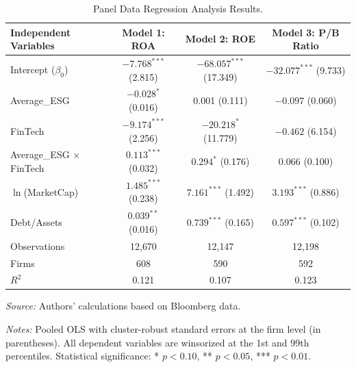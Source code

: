 \documentclass[12pt]{article}
\begin{document}
\begin{table}[htbp]
\centering
\caption{Panel Data Regression Analysis Results.}\label{tab:reg}
\begin{threeparttable}
\begin{tabular}{lccc}
\toprule
Independent Variables & Model 1: ROA & Model 2: ROE & Model 3: P/B Ratio \\
\midrule
Intercept ($\beta_0$) & $-7.768^{***}$ (2.815) & $-68.057^{***}$ (17.349) & $-32.077^{***}$ (9.733) \\
Average\_ESG & $-0.028^{*}$ (0.016) & 0.001 (0.111) & $-0.097$ (0.060) \\
FinTech & $-9.174^{***}$ (2.256) & $-20.218^{*}$ (11.779) & $-0.462$ (6.154) \\
Average\_ESG $\times$ FinTech & $0.113^{***}$ (0.032) & $0.294^{*}$ (0.176) & 0.066 (0.100) \\
$\ln$(MarketCap) & $1.485^{***}$ (0.238) & $7.161^{***}$ (1.492) & $3.193^{***}$ (0.886) \\
Debt/Assets & $0.039^{**}$ (0.016) & $0.739^{***}$ (0.165) & $0.597^{***}$ (0.102) \\
\midrule
Observations & 12{,}670 & 12{,}147 & 12{,}198 \\
Firms & 608 & 590 & 592 \\
$R^2$ & 0.121 & 0.107 & 0.123 \\
\bottomrule
\end{tabular}
\begin{tablenotes}
\small
\item \textit{Source:} Authors' calculations based on Bloomberg data.
\item \textit{Notes:} Pooled OLS with cluster-robust standard errors at the firm level (in parentheses). All dependent variables are winsorized at the 1st and 99th percentiles. Statistical significance: * $p < 0.10$, ** $p < 0.05$, *** $p < 0.01$.
\end{tablenotes}
\end{threeparttable}
\end{table}
\end{document}
